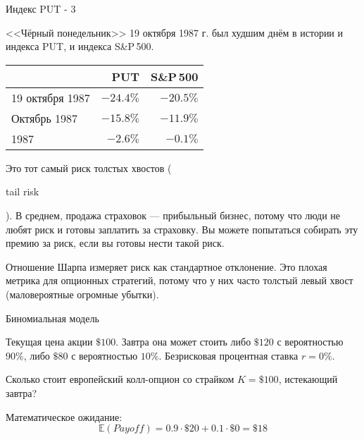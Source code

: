 \documentclass{beamer}
\newcommand{\en}[1]{\begin{otherlanguage}{english}#1\end{otherlanguage}}
\begin{document}
\begin{frame}{Индекс PUT - 3}

\justify
<<Чёрный понедельник>> 19 октября 1987 г. был худшим днём в истории и индекса PUT, и индекса S\&P\,500.

\centering
\begin{tabular}{l|r|r}
& PUT & S\&P\,500 \\ \hline
19 октября 1987 & $-24.4\%$ & $-20.5\%$ \\
Октябрь 1987 & $-15.8\%$ & $-11.9\%$ \\
1987 & $-2.6\%$ & $-0.1\%$ 
\end{tabular}

\justify
Это тот самый риск толстых хвостов (\en{tail risk}). В среднем, продажа страховок --- прибыльный бизнес, потому что люди не любят риск и готовы заплатить за страховку. Вы можете попытаться собирать эту премию за риск, если вы готовы нести такой риск.

\justify
Отношение Шарпа измеряет риск как стандартное отклонение. Это плохая метрика для опционных стратегий, потому что у них часто толстый левый хвост (маловероятные огромные убытки).
\end{frame}



\newcommand{\drawStockNode}[5]{

	\node (#5)
	[
		draw,
		rectangle,
		rounded corners,
		inner sep = 0pt,
		outer sep = 0pt,
		minimum width = 2.4cm,
		minimum height = 0.55cm,
		align = center
	]
	at (#3, #4)
	{
		\begin{tabular}{c|c}
		#1 & #2
		\end{tabular}
	};
}

\newcommand{\drawStockLink}[4]{

	\draw[
		->,
		>=triangle 90
	]
	(#1.east) -- (#2.west)
	node[
		pos = 0.5,
		anchor = #4
	]
	{#3};
}

\newcommand{\drawOneStepBinomialTree}{
	\drawStockNode{\$100}{?}{0}{0}{S0_node}
	\drawStockNode{\$120}{\$20}{4}{ 1}{Su_node}
	\drawStockNode{\$80}{\$0}{4}{-1}{Sd_node}
	
	\drawStockLink{S0_node}{Su_node}{$90\%$}{south east}	
	\drawStockLink{S0_node}{Sd_node}{$10\%$}{north east}
}

\begin{frame}{Биномиальная модель}
\centering
{}

\justify
Текущая цена акции $\$100$. Завтра она может стоить либо $\$120$ с вероятностью $90\%$, либо $\$80$ с вероятностью $10\%$. Безрисковая процентная ставка $r=0\%$.

\justify
Сколько стоит европейский колл-опцион со страйком $K=\$100$, истекающий завтра?

\justify
Математическое ожидание:
$$\mathbb{E}(Payoff) = 0.9\cdot \$20 + 0.1\cdot \$0 = \$18 $$
\end{frame}
\end{document}

